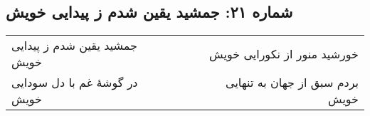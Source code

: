 \begin{center}
\section*{شماره ۲۱: جمشید یقین شدم ز پیدایی خویش}
\label{sec:021}
\begin{longtable}{l p{0.5cm} r}
جمشید یقین شدم ز پیدایی خویش
&&
خورشید منور از نکورایی خویش
\\
در گوشهٔ غم با دل سودایی خویش
&&
بردم سبق از جهان به تنهایی خویش
\\
\end{longtable}
\end{center}
